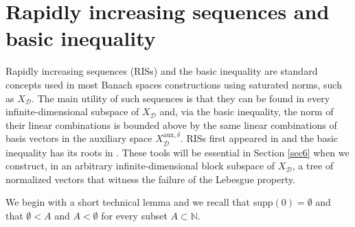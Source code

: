 \documentclass[12pt,a4paper]{amsart}
\newcommand{\N}{\mathbb{N}}
\newcommand{\supp}{\text{supp}}
\theoremstyle{definition}
\theoremstyle{plain}
\begin{document}
\section{Rapidly increasing sequences and basic inequality}{\label{sec5}}

Rapidly increasing sequences (RISs) and the basic inequality are standard concepts used in most Banach spaces constructions using saturated norms, such as $X_\mathcal{D}$. The main utility of such sequences is that they can be found in every infinite-dimensional subspace of $X_\mathcal{D}$ and, via the basic inequality, the norm of their linear combinations is bounded above by the same linear combinations of basis vectors in the auxiliary space $X_\mathcal{D}^{\mathrm{aux},\delta}$. RISs first appeared in \cite{schlumprecht:1991} and the basic inequality has its roots in \cite{argyros:deliyanni:1997}. These tools will be essential in Section \ref{sec6} when we construct, in an arbitrary infinite-dimensional block subspace of $X_\mathcal{D}$, a tree of normalized vectors that witness the failure of the Lebesgue property.




We begin with a short technical lemma and we recall that $\supp(0)=\emptyset$ and that $\emptyset < A$ and $A<\emptyset$ for every subset $A\subset\N$.
\end{document}
